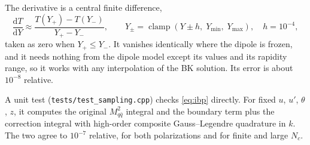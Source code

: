 \documentclass[11pt,a4paper]{article}
\newcommand{\Mqq}{M_{q\bar q}^2}
\newcommand{\dd}{\mathrm{d}}
\begin{document}
The derivative is a central finite difference,
\begin{equation}
  \frac{\dd T}{\dd Y} \approx
  \frac{T(Y_+) - T(Y_-)}{Y_+ - Y_-} ,
  \qquad
  Y_\pm = \operatorname{clamp}\!\left(Y \pm h, \; Y_{\min}, \; Y_{\max}\right) ,
  \quad h = 10^{-4} ,
\end{equation}
taken as zero when $Y_+ \le Y_-$. It vanishes identically where the dipole is
frozen, and it needs nothing from the dipole model except its values and its
rapidity range, so it works with any interpolation of the BK solution. Its
error is about $10^{-8}$ relative.

A unit test (\texttt{tests/test\_sampling.cpp}) checks \eqref{eq:ibp} directly.
For fixed $u$, $u'$, $\theta$, $z$, it computes the original $\Mqq$ integral and
the boundary term plus the correction integral with high-order composite
Gauss--Legendre quadrature in $k$. The two agree to $10^{-7}$ relative, for both
polarizations and for finite and large $N_c$.
\end{document}
